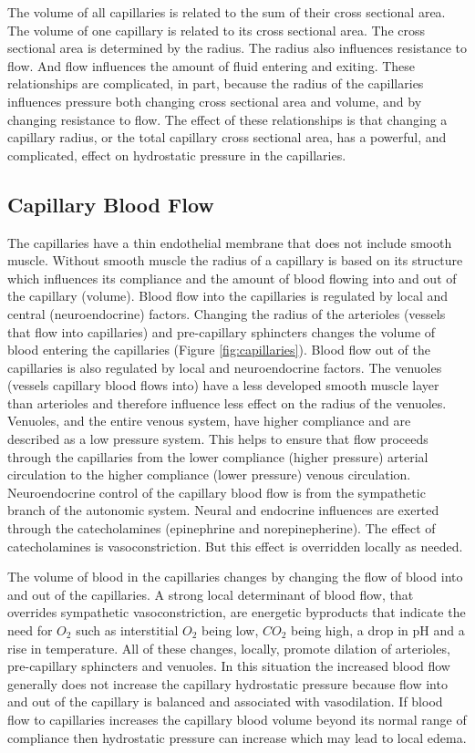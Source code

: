 The volume of all capillaries is related to the sum of their cross sectional area. The volume of one capillary is related to its cross sectional area. The cross sectional area is determined by the radius. The radius also influences resistance to flow. And flow influences the amount of fluid entering and exiting. These relationships are complicated, in part, because the radius of the capillaries influences pressure both changing cross sectional area and volume, and by changing resistance to flow. The effect of these relationships is that changing a capillary radius, or the total capillary cross sectional area, has a powerful, and complicated, effect on hydrostatic pressure in the capillaries.


\subsection{Capillary Blood Flow}

The capillaries have a thin endothelial membrane that does not include smooth muscle. Without smooth muscle the radius of a capillary is based on its structure which influences its compliance and the amount of blood flowing into and out of the capillary (volume). Blood flow into the capillaries is regulated by local and central (neuroendocrine) factors. Changing the radius of the arterioles (vessels that flow into capillaries) and pre-capillary sphincters changes the volume of blood entering the capillaries (Figure \ref{fig:capillaries}). Blood flow out of the capillaries is also regulated by local and neuroendocrine factors. The venuoles (vessels capillary blood flows into) have a less developed smooth muscle layer than arterioles and therefore influence less effect on the radius of the venuoles. Venuoles, and the entire venous system, have higher compliance and are described as a low pressure system. This helps to ensure that flow proceeds through the capillaries from the lower compliance (higher pressure) arterial circulation to the higher compliance (lower pressure) venous circulation. Neuroendocrine control of the capillary blood flow is from the sympathetic branch of the autonomic system. Neural and endocrine influences are exerted through the catecholamines (epinephrine and norepinepherine). The effect of catecholamines is vasoconstriction. But this effect is overridden locally as needed. 

The volume of blood in the capillaries changes by changing the flow of blood into and out of the capillaries. A strong local determinant of blood flow, that overrides sympathetic vasoconstriction, are energetic byproducts that indicate the need for $O_2$ such as interstitial $O_2$ being low, $CO_2$ being high, a drop in pH and a rise in temperature. All of these changes, locally, promote dilation of arterioles, pre-capillary sphincters and venuoles. In this situation the increased blood flow generally does not increase the capillary hydrostatic pressure because flow into and out of the capillary is balanced and associated with vasodilation. If blood flow to capillaries increases the capillary blood volume beyond its normal range of compliance then hydrostatic pressure can increase which may lead to local edema.

